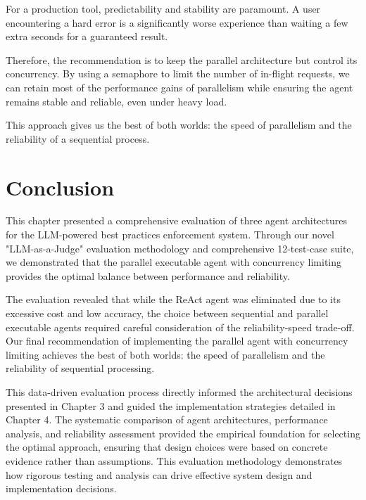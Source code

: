 \begin{spacing}{1.2}
For a production tool, predictability and stability are paramount. A user encountering a hard error is a significantly worse experience than waiting a few extra seconds for a guaranteed result.

Therefore, the recommendation is to keep the parallel architecture but control its concurrency. By using a semaphore to limit the number of in-flight requests, we can retain most of the performance gains of parallelism while ensuring the agent remains stable and reliable, even under heavy load.

This approach gives us the best of both worlds: the speed of parallelism and the reliability of a sequential process. 

\section*{Conclusion}
This chapter presented a comprehensive evaluation of three agent architectures for the LLM-powered best practices enforcement system. Through our novel "LLM-as-a-Judge" evaluation methodology and comprehensive 12-test-case suite, we demonstrated that the parallel executable agent with concurrency limiting provides the optimal balance between performance and reliability.

The evaluation revealed that while the ReAct agent was eliminated due to its excessive cost and low accuracy, the choice between sequential and parallel executable agents required careful consideration of the reliability-speed trade-off. Our final recommendation of implementing the parallel agent with concurrency limiting achieves the best of both worlds: the speed of parallelism and the reliability of sequential processing.

This data-driven evaluation process directly informed the architectural decisions presented in Chapter 3 and guided the implementation strategies detailed in Chapter 4. The systematic comparison of agent architectures, performance analysis, and reliability assessment provided the empirical foundation for selecting the optimal approach, ensuring that design choices were based on concrete evidence rather than assumptions. This evaluation methodology demonstrates how rigorous testing and analysis can drive effective system design and implementation decisions.

\end{spacing}
